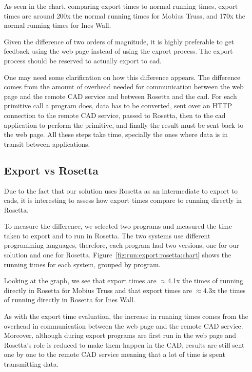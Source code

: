 As seen in the chart, comparing export times to normal running times, export times are around 200x the normal running times for Mobius Truss, and 170x the normal running times for Ines Wall.

Given the difference of two orders of magnitude, it is highly preferable to get feedback using the web page instead of using the export process.
The export process should be reserved to actually export to \gls{cad}.

One may need some clarification on how this difference appears.
The difference comes from the amount of overhead needed for communication between the web page and the remote CAD service and between Rosetta and the \gls{cad}.
For each primitive call a program does, data has to be converted, sent over an HTTP connection to the remote CAD service, passed to Rosetta, then to the \gls{cad} application to perform the primitive, and finally the result must be sent back to the web page.
All these steps take time, specially the ones where data is in transit between applications.


\subsection{Export vs Rosetta}
Due to the fact that our solution uses Rosetta as an intermediate to export to \glspl{cad}, it is interesting to assess how export times compare to running directly in Rosetta.

To measure the difference, we selected two programs and measured the time taken to export and to run in Rosetta.
The two systems use different programming languages, therefore, each program had two versions, one for our solution and one for Rosetta.
Figure~\ref{fig:run:export:rosetta:chart} shows the running times for each system, grouped by program.

Looking at the graph, we see that export times are $\approx$4.1x the times of running directly in Rosetta for Mobius Truss and that export times are $\approx$4.3x the times of running directly in Rosetta for Ines Wall.

As with the export time evaluation, the increase in running times comes from the overhead in communication between the web page and the remote CAD service.
Moreover, although during export programs are first run in the web page and Rosetta's role is reduced to make them happen in the CAD, results are still sent one by one to the remote CAD service meaning that a lot of time is spent transmitting data.

